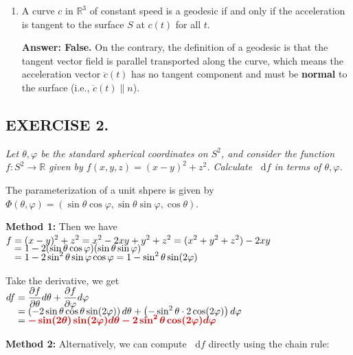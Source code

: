 \documentclass[a4paper,12pt]{article}
\newcommand{\formu}[1]{\textcolor{formulacolor}{\bm{#1}}}
\newcommand{\sol}[1]{\textcolor{examplecolor}{#1}}
\renewcommand{\d}{\mathop{}\!\mathrm{d}}
\begin{document}
\begin{enumerate}[label=(\roman*)]
    \textbf{Answer: False.}

    \item A curve $c$ in $\mathbb{R}^{3}$ of constant speed is a geodesic if and only if the acceleration is tangent to the surface $S$ at $c(t)$ for all $t$.
    
    \textbf{Answer: False.}
    \sol{On the contrary, the definition of a geodesic is that the tangent vector field is parallel transported along the curve, which means the acceleration vector $\ddot{c}(t)$ has no tangent component and must be \textbf{normal} to the surface (i.e., $\ddot{c}(t) \parallel n$).}
\end{enumerate}

\subsection{EXERCISE 2.}
\textit{Let $\theta, \varphi$ be the standard spherical coordinates on $S^{2}$, and consider the function $f:S^{2}\rightarrow\mathbb{R}$ given by $f(x,y,z)=(x-y)^{2}+z^{2}$. Calculate $\d f$ in terms of $\theta,\varphi$.}\par
The parameterization of a unit shpere is given by \sol{$\Phi(\theta,\varphi)=(\sin\theta\cos\varphi,\sin\theta\sin\varphi,\cos\theta)$}.\par
\textbf{Method 1:} Then we have \sol{$\setlength{\jot}{-4pt}\begin{aligned}[t]
    f &= (x-y)^2 + z^2 = x^2 - 2xy + y^2 + z^2 = (x^2 + y^2 + z^2) - 2xy \\
    &= 1 - 2(\sin\theta\cos\varphi)(\sin\theta\sin\varphi) \\
    &= 1 - 2\sin^2\theta \sin\varphi \cos\varphi = 1 - \sin^2\theta \sin(2\varphi)
\end{aligned}$}\par
Take the derivative, we get \sol{${\setlength{\jot}{-4pt}\begin{aligned}[t]
    df &= \frac{\partial f}{\partial \theta} d\theta + \frac{\partial f}{\partial \varphi} d\varphi \\
    &= \left( -2\sin\theta\cos\theta \sin(2\varphi) \right) d\theta + \left( -\sin^2\theta \cdot 2\cos(2\varphi) \right) d\varphi \\
    &= \formu{-\sin(2\theta)\sin(2\varphi) d\theta - 2\sin^2\theta\cos(2\varphi) d\varphi}
\end{aligned}}$}\par
\textbf{Method 2:} Alternatively, we can compute $\d f$ directly using the chain rule: \par
\end{document}
